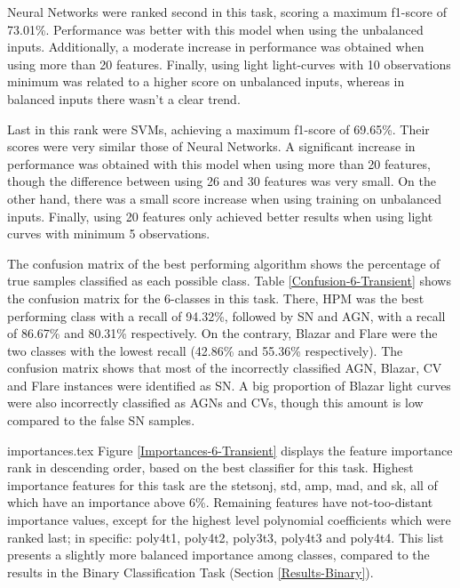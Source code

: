 Neural Networks were ranked second in this task, scoring a maximum f1-score of 73.01\%. Performance was better with this model when using the unbalanced inputs. Additionally, a moderate increase in performance was obtained when using more than 20 features. Finally, using light light-curves with 10 observations minimum was related to a higher score on unbalanced inputs, whereas in balanced inputs there wasn't a clear trend.

Last in this rank were SVMs, achieving a maximum f1-score of 69.65\%. Their scores were very similar those of Neural Networks. A significant increase in performance was obtained with this model when using more than 20 features, though the difference between using 26 and 30 features was very small. On the other hand, there was a small score increase when using training on unbalanced inputs. Finally, using 20 features only achieved better results when using light curves with minimum 5 observations.

The confusion matrix of the best performing algorithm shows the percentage of true samples classified as each possible class. 
Table \ref{Confusion-6-Transient} shows the confusion matrix for the 6-classes in this task. There, HPM was the best performing class with a recall of 94.32\%, followed by SN and AGN, with a recall of 86.67\% and 80.31\% respectively. On the contrary, Blazar and Flare were the two classes with the lowest recall (42.86\% and 55.36\% respectively). The confusion matrix shows that most of the incorrectly classified AGN, Blazar, CV and Flare instances were identified as SN. A big proportion of Blazar light curves were also incorrectly classified as AGNs and CVs, though this amount is low compared to the false SN samples.


{importances.tex}
Figure \ref{Importances-6-Transient} displays the feature importance rank in descending order, based on the best classifier for this task. 
Highest importance features for this task are the
stetson\textunderscore j, std, amp, mad, and sk, all of which have an importance above 6\%. 
Remaining features have not-too-distant importance values, except for the highest level polynomial coefficients which were ranked last; in specific: 
poly4\textunderscore t1, poly4\textunderscore t2, poly3\textunderscore t3, poly4\textunderscore t3 and poly4\textunderscore t4. 
This list presents a slightly more balanced importance among classes, compared to the results in the Binary Classification Task (Section \ref{Results-Binary}).

